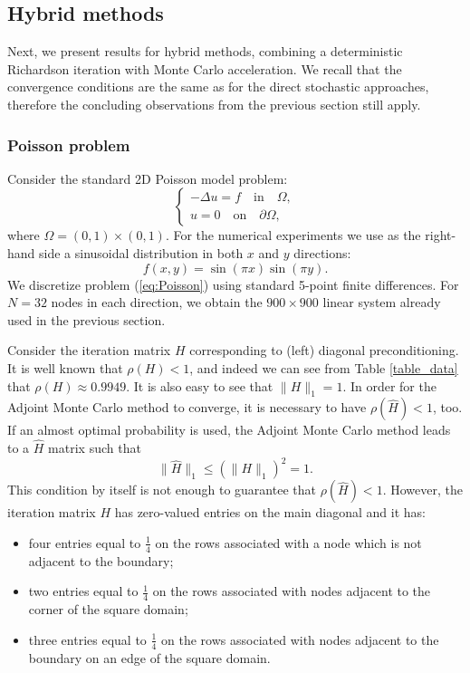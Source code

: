 \documentclass[final,leqno,onefignum,onetabnum]{siamltex1213}
\begin{document}
\subsection{Hybrid methods}
Next, we present results for hybrid methods, combining a deterministic
Richardson iteration with Monte Carlo acceleration. We recall that the
convergence conditions are the same as for the direct stochastic
approaches, therefore the concluding observations from the previous section
still apply.

\subsubsection{Poisson problem}

Consider the standard 2D Poisson model problem:
\begin{equation}
\begin{cases}
 -\Delta u = f \quad \text{in}\quad \Omega, \\
 u=0\quad \text{on} \quad \partial\Omega ,
 \end{cases}
\label{eq:Poisson}
\end{equation}
where $\Omega=(0,1)\times (0,1)$. %
For the numerical experiments we use as the right-hand side
a sinusoidal distribution in both $x$ and $y$ directions:
\[
 f(x, y)=\sin ({\pi x})\sin ({\pi y}).
\]
We discretize problem (\ref{eq:Poisson}) using standard 5-point finite
differences. For $N=32$ nodes in each direction, we obtain the $900\times 900$
linear system already used in the previous section.

Consider the iteration matrix $H$ corresponding to (left) diagonal
preconditioning. It is well known that $\rho(H) <1$, and indeed we
can see from Table \ref{table_data} that $\rho(H)\approx 0.9949$. 
It is also easy to see that $\|H\|_1 = 1$. 
In order for the Adjoint Monte Carlo
method to converge, it is necessary to 
have $\rho(\hat{H}) < 1$, too. If an
almost optimal probability is used,
the Adjoint Monte Carlo method leads to a $\hat{H}$ matrix such that
\[
 \lVert \hat{H}\rVert_1\le (\rVert H\rVert_1)^2=1.
\]
This condition by itself is not enough to guarantee that
$\rho(\hat{H})<1$.
However, the iteration matrix $H$ has zero-valued
entries on the main diagonal and it has:
\begin{itemize}
 \item four entries equal to $\frac{1}{4}$ on the rows associated
with a node which is not adjacent to the boundary;
\item two entries equal to $\frac{1}{4}$ on the rows associated with nodes
adjacent to the corner of the square domain;
\item three entries equal to $\frac{1}{4}$ on the rows associated with nodes
adjacent to the boundary on an edge of the square domain.
\end{itemize}
\end{document}
